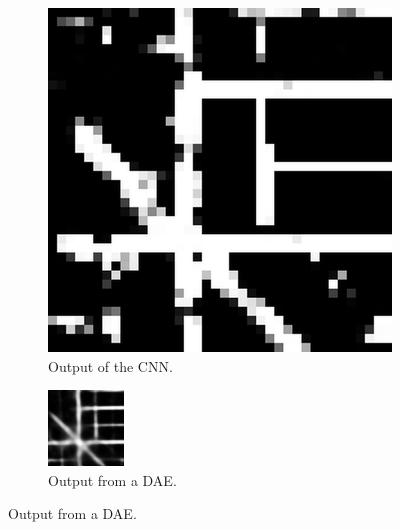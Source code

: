 \documentclass[10pt,conference,compsocconf]{IEEEtran}
\begin{document}
\begin{figure}[h!]

\begin{subfigure}{0.2\textwidth}
\includegraphics[width=\linewidth]{raw_test_14_pixels.png}
\caption{Output of the CNN.}
\label{fig:DAE1}
\end{subfigure}
\hspace*{\fill}
\begin{subfigure}{0.2\textwidth}
\includegraphics[width=\linewidth]{ae_test_14.png}
\caption{Output from a DAE.}
\label{fig:DAE2}
\end{subfigure}


\end{figure}
\end{document}
